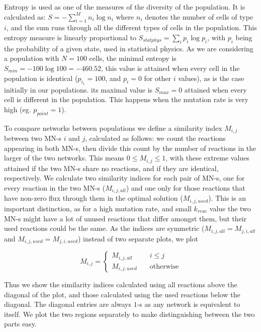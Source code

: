 \documentclass[a4paper,12pt]{article}
\begin{document}
Entropy is used as one of the measures of the diversity of the population. It is calculated as: $S=- \sum^{M}_{i=1} n_i \log n_i $ where $n_i$ denotes the number of cells of type $i$, and the sum runs through all the different types of cells in the population. This entropy measure is linearly proportional to $S_{statphys}=\sum_i p_i \log p_i$, with $p_i$ being the probability of a given state, used in statistical physics. As we are considering a population with $N=100$ cells, the minimal entropy is $S_{min}=-100\log100=-460.52$, this value is attained when every cell in the population is identical ($p_{i_1}=100$, and $p_i=0$ for other $i$ values), as is the case initially in our populations. its maximal value is $S_{max}=0$ attained when every cell is different in the population. This happens when the mutation rate is very high (eg. $p_{point}=1$). 


To compare networks between populations we define a similarity index $M_{i,j}$ between two MN-s $i$ and $j$, calculated as follows: we count the reactions appearing in both MN-s, then divide this count by the number of reactions in the larger of the two networks. This means $0\leq M_{i,j} \leq 1$, with these extreme values attained if the two MN-s share no reactions, and if they are identical, respectively. We calculate two similarity indices for each pair of MN-s, one for every reaction in the two MN-s ($M_{i,j,all}$) and one only for those reactions that have non-zero flux through them in the optimal solution ($M_{i,j,used}$). This is an important distinction, as for a high mutation rate, and small $k_{reac}$ value the two MN-s might have a lot of unused reactions that differ amongst them, but their used reactions could be the same.  As the indices are symmetric ($M_{i,j,all}=M_{j,i,all}$ and  $M_{i,j,used}=M_{j,i,used}$) instead of two separate plots, we plot 

$$
M_{i,j}= \left\{
	\begin{array}{ll}
		M_{i,j,all} & \quad i \leq j \\
		M_{i,j,used} & \quad \text{otherwise}
	\end{array}
\right.
$$

Thus we show the similarity indices calculated using all reactions above the diagonal of the plot, and those calculated using the used reactions below the diagonal. The diagonal entries are always $1$-s as any network is equivalent to itself. We plot the two regions separately to make distinguishing between the two parts easy.
\end{document}
